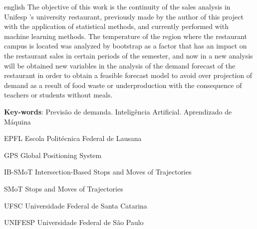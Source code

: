 \documentclass[	12pt, Times, openright, twoside, a4paper, english, brazil]{abntex2}
\begin{document}
\begin{resumo}[Abstract]
 \begin{otherlanguage*}{english}
 The objective of this work is the continuity of the sales analysis in Unifesp 's university restaurant, previously made by the author of this project with the application of statistical methods, and currently performed with machine learning methods. The temperature of the region where the restaurant campus is located was analyzed by bootstrap as a factor that has an impact on the restaurant sales in certain periods of the semester, and now in a new analysis will be obtained new variables in the analysis of the demand forecast of the restaurant in order to obtain a feasible forecast model to avoid over projection of demand as a result of food waste or underproduction with the consequence of teachers or students without meals.


   \vspace{\onelineskip}
 
   \noindent 
   \textbf{Key-words}: Previsão de demanda. Inteligência Artificial. Aprendizado de Máquina
 \end{otherlanguage*}
\end{resumo}

\listoffigures*
\cleardoublepage

\listoftables*
\cleardoublepage

\begin{siglas}
\item[EPFL] Escola Politécnica Federal de Lausana
\item[GPS] Global Positioning System
\item[IB-SMoT] Intersection-Based Stops and Moves of Trajectories
\item[SMoT] Stops and Moves of Trajectories
\item[UFSC] Universidade Federal de Santa Catarina
\item[UNIFESP] Universidade Federal de São Paulo
\end{siglas}

\end{document}
